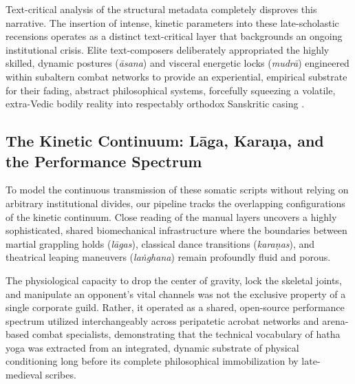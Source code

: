 \documentclass[11pt,twoside,letterpaper]{article}
\begin{document}
Text-critical analysis of the structural metadata completely disproves this narrative. The insertion of intense, kinetic parameters into these late-scholastic recensions operates as a distinct text-critical layer that backgrounds an ongoing institutional crisis. Elite text-composers deliberately appropriated the highly skilled, dynamic postures (\textit{āsana}) and visceral energetic locks (\textit{mudrā}) engineered within subaltern combat networks to provide an experiential, empirical substrate for their fading, abstract philosophical systems, forcefully squeezing a volatile, extra-Vedic bodily reality into respectably orthodox Sanskritic casing \citep{Bouy1994}.

\subsection{The Kinetic Continuum: Lāga, Karaṇa, and the Performance Spectrum}
To model the continuous transmission of these somatic scripts without relying on arbitrary institutional divides, our pipeline tracks the overlapping configurations of the kinetic continuum. Close reading of the manual layers uncovers a highly sophisticated, shared biomechanical infrastructure where the boundaries between martial grappling holds (\textit{lāgas}), classical dance transitions (\textit{karaṇas}), and theatrical leaping maneuvers (\textit{laṅghana}) remain profoundly fluid and porous. 

The physiological capacity to drop the center of gravity, lock the skeletal joints, and manipulate an opponent's vital channels was not the exclusive property of a single corporate guild. Rather, it operated as a shared, open-source performance spectrum utilized interchangeably across peripatetic acrobat networks and arena-based combat specialists, demonstrating that the technical vocabulary of hatha yoga was extracted from an integrated, dynamic substrate of physical conditioning long before its complete philosophical immobilization by late-medieval scribes.
\end{document}
